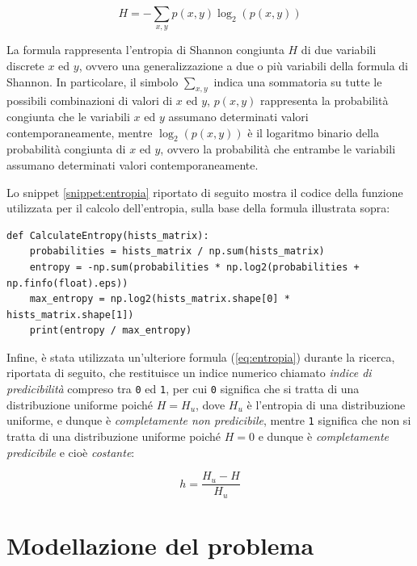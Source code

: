 \documentclass[12pt,italian]{report}
\begin{document}
	\begin{equation}
		H = - \sum_{x,y} p(x,y) \log_2(p(x,y))
		\label{eq:shannon}
	\end{equation}
	
	La formula rappresenta l'entropia di Shannon congiunta $ H $ di due variabili discrete $ x $ ed $ y $, ovvero una generalizzazione a due o più variabili della formula di Shannon. In particolare, il simbolo $ \sum_{x,y} $ indica una sommatoria su tutte le possibili combinazioni di valori di $ x $ ed $ y $, $ p(x,y) $ rappresenta la probabilità congiunta che le variabili $ x $ ed $ y $ assumano determinati valori contemporaneamente, mentre $ \log_2(p(x,y)) $ è il logaritmo binario della probabilità congiunta di $ x $ ed $ y $, ovvero la probabilità che entrambe le variabili assumano determinati valori contemporaneamente.
	
	Lo snippet \ref{snippet:entropia} riportato di seguito mostra il codice della funzione utilizzata per il calcolo dell'entropia, sulla base della formula illustrata sopra:
	
	\lstset{language=Python}
	\begin{lstlisting}[aboveskip=15pt, belowskip=15pt, basicstyle=\fontsize{8}{10}\selectfont, keywordstyle=\color{blue}, breaklines=true, label=snippet:entropia]
def CalculateEntropy(hists_matrix):
    probabilities = hists_matrix / np.sum(hists_matrix)
    entropy = -np.sum(probabilities * np.log2(probabilities + np.finfo(float).eps))
    max_entropy = np.log2(hists_matrix.shape[0] * hists_matrix.shape[1])
    print(entropy / max_entropy)
	\end{lstlisting}
	
	Infine, è stata utilizzata un'ulteriore formula (\ref{eq:entropia}) durante la ricerca, riportata di seguito, che restituisce un indice numerico chiamato \textit{indice di predicibilità} compreso tra \texttt{0} ed \texttt{1}, per cui \texttt{0} significa che si tratta di una distribuzione uniforme poiché $ H = H_{u} $, dove $ H_{u} $ è l'entropia di una distribuzione uniforme, e dunque è \textit{completamente non predicibile}, mentre \texttt{1} significa che non si tratta di una distribuzione uniforme poiché $ H = 0 $ e dunque è \textit{completamente predicibile} e cioè \textit{costante}:
	
	\begin{equation}
		h = \frac{H_{u} - H}{H_{u}}
		\label{eq:entropia}
	\end{equation}
	
	
	\section{Modellazione del problema}
	\label{sec:modellazione}
	
\end{document}
